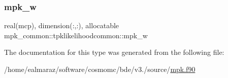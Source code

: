 \subsubsection{\texorpdfstring{mpk\+\_\+w}{mpk\_w}}
{\footnotesize\ttfamily real(mcp), dimension(\+:,\+:), allocatable mpk\+\_\+common\+::tpklikelihoodcommon\+::mpk\+\_\+w\hspace{0.3cm}{\ttfamily [private]}}



The documentation for this type was generated from the following file\+:\begin{DoxyCompactItemize}
\item 
/home/ealmaraz/software/cosmomc/bde/v3./source/\mbox{\hyperlink{mpk_8f90}{mpk.\+f90}}\end{DoxyCompactItemize}

